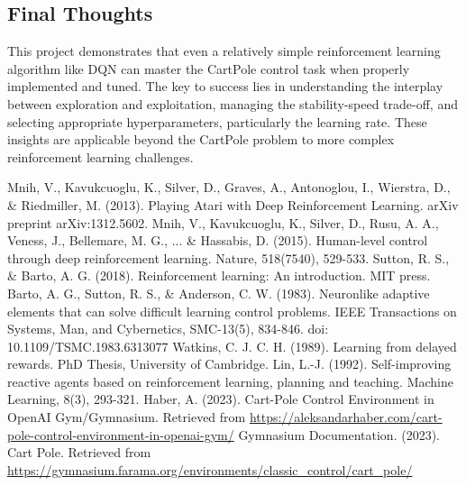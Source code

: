 \documentclass{article}
\begin{document}
\subsection{Final Thoughts}
This project demonstrates that even a relatively simple reinforcement learning algorithm like DQN can master the CartPole control task when properly implemented and tuned. The key to success lies in understanding the interplay between exploration and exploitation, managing the stability-speed trade-off, and selecting appropriate hyperparameters, particularly the learning rate. These insights are applicable beyond the CartPole problem to more complex reinforcement learning challenges.


\begin{thebibliography}{9}
 Mnih, V., Kavukcuoglu, K., Silver, D., Graves, A., Antonoglou, I., Wierstra, D., \& Riedmiller, M. (2013). Playing Atari with Deep Reinforcement Learning. arXiv preprint arXiv:1312.5602.
 Mnih, V., Kavukcuoglu, K., Silver, D., Rusu, A. A., Veness, J., Bellemare, M. G., ... \& Hassabis, D. (2015). Human-level control through deep reinforcement learning. Nature, 518(7540), 529-533.
 Sutton, R. S., \& Barto, A. G. (2018). Reinforcement learning: An introduction. MIT press.
 Barto, A. G., Sutton, R. S., \& Anderson, C. W. (1983). Neuronlike adaptive elements that can solve difficult learning control problems. IEEE Transactions on Systems, Man, and Cybernetics, SMC-13(5), 834-846. doi: 10.1109/TSMC.1983.6313077
 Watkins, C. J. C. H. (1989). Learning from delayed rewards. PhD Thesis, University of Cambridge.
 Lin, L.-J. (1992). Self-improving reactive agents based on reinforcement learning, planning and teaching. Machine Learning, 8(3), 293-321.
 Haber, A. (2023). Cart-Pole Control Environment in OpenAI Gym/Gymnasium. Retrieved from \url{https://aleksandarhaber.com/cart-pole-control-environment-in-openai-gym/}
 Gymnasium Documentation. (2023). Cart Pole. Retrieved from \url{https://gymnasium.farama.org/environments/classic_control/cart_pole/}
\end{thebibliography}
\end{document}
